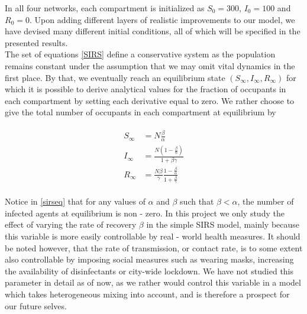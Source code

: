 In all four networks, each compartment is initialized as $S_0 = 300$, $I_0 = 100$ and $R_0 = 0$. Upon adding different layers of realistic improvements to our model, we have devised many different initial conditions, all of which will be specified in the presented results.\\

The set of equations \eqref{SIRS} define a conservative system as the population remains constant under the assumption that we may omit vital dynamics in the first place. By that, we eventually reach an equilibrium state $(S_\infty, I_\infty, R_\infty)$ for which it is possible to derive analytical values for the fraction of occupants in each compartment by setting each derivative equal to zero. We rather choose to give the total number of occupants in each compartment
at equilibrium by

\begin{align}
    \begin{split}
        S_\infty &= N\frac{\beta}{\alpha}\\
        I_\infty &= \frac{N(1-\frac{\beta}{\alpha})}{1+\beta\gamma}\\
        R_\infty &= \frac{N\beta}{\gamma}\frac{1-\frac{\beta}{\alpha}}{1+\frac{\beta}{\gamma}}
        \label{sirseq}
    \end{split}
\end{align}

Notice in \eqref{sirseq} that for any values of $\alpha$ and $\beta$ such that $\beta < \alpha$, the number of infected agents at equilibrium is non - zero. In this project we only study the effect of varying the rate of recovery $\beta$ in the simple SIRS model, mainly because this variable is more easily controllable by real - world health measures. It should be noted however, that the rate of transmission, or contact rate, is to some extent also controllable by imposing social measures such as wearing masks, increasing the availability of disinfectants or city-wide lockdown. We have not studied this parameter in detail as of now, as we rather would control this variable in a model which takes heterogeneous mixing into account, and is therefore a prospect for our future selves.   